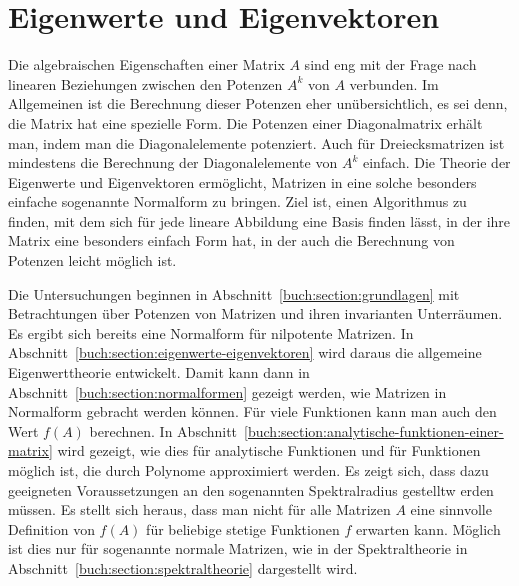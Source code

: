 %
%
%
\chapter{Eigenwerte und Eigenvektoren
\label{buch:chapter:eigenwerte-und-eigenvektoren}}
\rhead{}
Die algebraischen Eigenschaften einer Matrix $A$ sind eng mit der
Frage nach linearen Beziehungen zwischen den Potenzen $A^k$ von $A$ verbunden.
Im Allgemeinen ist die Berechnung dieser Potenzen eher unübersichtlich,
es sei denn, die Matrix hat eine spezielle Form.
Die Potenzen einer Diagonalmatrix erhält man, indem man die Diagonalelemente
potenziert.
%
Auch für Dreiecksmatrizen ist mindestens die Berechnung der Diagonalelemente
von $A^k$ einfach.
%
Die Theorie der Eigenwerte und Eigenvektoren ermöglicht, Matrizen in
%
eine solche besonders einfache sogenannte Normalform zu bringen.
%
Ziel ist, einen Algorithmus zu finden, mit dem sich für jede lineare
Abbildung eine Basis finden lässt, in der ihre Matrix eine besonders
einfach Form hat, in der auch die Berechnung von Potenzen leicht
möglich ist.

Die Untersuchungen beginnen in
Abschnitt~\ref{buch:section:grundlagen} mit Betrachtungen über
Potenzen von Matrizen und ihren invarianten Unterräumen.
%
%
%
Es ergibt sich bereits eine Normalform für nilpotente Matrizen.
%
In Abschnitt~\ref{buch:section:eigenwerte-eigenvektoren} wird daraus die
allgemeine Eigenwerttheorie entwickelt.
Damit kann dann in Abschnitt~\ref{buch:section:normalformen}
gezeigt werden, wie Matrizen in Normalform gebracht werden können.
Für viele Funktionen kann man auch den Wert $f(A)$ berechnen.
In Abschnitt~\ref{buch:section:analytische-funktionen-einer-matrix} wird
gezeigt, wie dies für analytische Funktionen und für Funktionen möglich
%
ist, die durch Polynome approximiert werden.
Es zeigt sich, dass dazu geeigneten Voraussetzungen an den sogenannten
Spektralradius gestelltw erden müssen.
%
Es stellt sich heraus, dass man nicht für alle Matrizen $A$ eine 
sinnvolle Definition von $f(A)$ für beliebige stetige Funktionen $f$
erwarten kann.
Möglich ist dies nur für sogenannte normale Matrizen, wie in
der Spektraltheorie in
Abschnitt~\ref{buch:section:spektraltheorie} dargestellt wird.


